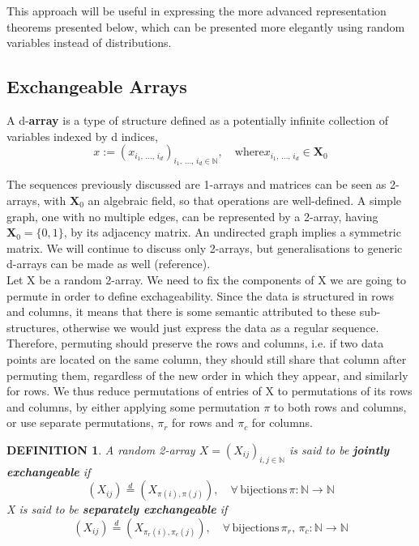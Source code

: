 \documentclass[12pt]{report}
\newtheorem{definition}[theorem]{DEFINITION}
\newcommand{\bs}{\boldsymbol}
\newcommand{\mb}[1]{\mathbb{#1}}
\renewcommand{\bs}{\boldsymbol}
\begin{document}
This approach will be useful in expressing the more advanced representation theorems presented below, which can be presented more elegantly using random variables instead of distributions. \\

\subsection{Exchangeable Arrays}

A d-\textbf{array} is a type of structure defined as a potentially infinite collection of variables indexed by d indices,
\begin{equation}
    x := (x_{i_1,\,\dots,\,i_d})_{i_1,\,\dots,\,i_d \in \mb{N}},\quad \text{where} x_{i_1,\,\dots,\,i_d} \in \bs{X}_0
\end{equation}

The sequences previously discussed are 1-arrays and matrices can be seen as 2-arrays, with $\bs{X}_0$ an algebraic field, so that operations are well-defined. A simple graph, one with no multiple edges, can be represented by a 2-array, having $\bs{X}_0 = \{0, 1\}$, by its adjacency matrix. An undirected graph implies a symmetric matrix. We will continue to discuss only 2-arrays, but generalisations to generic d-arrays can be made as well (reference). \\

Let X be a random 2-array. We need to fix the components of X we are going to permute in order to define exchageability. Since the data is structured in rows and columns, it means that there is some semantic attributed to these sub-structures, otherwise we would just express the data as a regular sequence. Therefore, permuting should preserve the rows and columns, i.e. if two data points are located on the same column, they should still share that column after permuting them, regardless of the new order in which they appear, and similarly for rows. We thus reduce permutations of entries of X to permutations of its rows and columns, by either applying some permutation $\pi$ to both rows and columns, or use separate permutations, $\pi_r$ for rows and $\pi_c$ for columns.

\begin{definition}
    A random 2-array $X = (X_{ij})_{i,j \in \mb{N}}$ is said to be \textbf{jointly exchangeable} if
    \begin{equation}
        (X_{ij}) \overset{d}{=} (X_{\pi (i), \pi (j)}), \quad \forall\, \text{bijections}\,\pi:\mb{N} \rightarrow \mb{N}
    \end{equation}
    X is said to be \textbf{separately exchangeable} if
    \begin{equation}
        (X_{ij}) \overset{d}{=} (X_{\pi_r (i), \pi_c (j)}), \quad \forall\, \text{bijections}\,\pi_r, \,\pi_c:\mb{N} \rightarrow \mb{N}
    \end{equation}
\end{definition}
\end{document}
